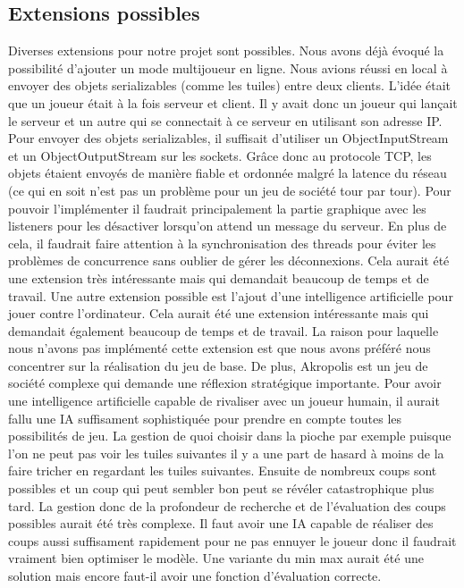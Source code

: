\documentclass{article}
\begin{document}
    
    \subsection{Extensions possibles}\label{subsec:extensions}

    Diverses extensions pour notre projet sont possibles. Nous avons déjà évoqué la possibilité d'ajouter un mode multijoueur en ligne. 
    Nous avions réussi en local à envoyer des objets serializables (comme les tuiles) entre deux clients. L'idée était que un joueur était à la fois serveur et client.
    Il y avait donc un joueur qui lançait le serveur et un autre qui se connectait à ce serveur en utilisant son adresse IP.
    Pour envoyer des objets serializables, il suffisait d'utiliser un ObjectInputStream et un ObjectOutputStream sur les sockets.
    Grâce donc au protocole TCP, les objets étaient envoyés de manière fiable et ordonnée malgré la latence du réseau (ce qui en soit n'est pas un problème pour un jeu de société tour par tour).
    Pour pouvoir l'implémenter il faudrait principalement la partie graphique avec les listeners pour les désactiver lorsqu'on attend un message du serveur.
    En plus de cela, il faudrait faire attention à la synchronisation des threads pour éviter les problèmes de concurrence sans oublier de gérer les déconnexions.
    Cela aurait été une extension très intéressante mais qui demandait beaucoup de temps et de travail.
    \newline
    Une autre extension possible est l'ajout d'une intelligence artificielle pour jouer contre l'ordinateur.
    Cela aurait été une extension intéressante mais qui demandait également beaucoup de temps et de travail.
    La raison pour laquelle nous n'avons pas implémenté cette extension est que nous avons préféré nous concentrer sur la réalisation du jeu de base.
    De plus, Akropolis est un jeu de société complexe qui demande une réflexion stratégique importante.
    Pour avoir une intelligence artificielle capable de rivaliser avec un joueur humain, il aurait fallu une IA suffisament sophistiquée pour prendre en compte toutes les possibilités de jeu.
    La gestion de quoi choisir dans la pioche par exemple puisque l'on ne peut pas voir les tuiles suivantes il y a une part de hasard à moins de la faire tricher en regardant les tuiles suivantes.
    Ensuite de nombreux coups sont possibles et un coup qui peut sembler bon peut se révéler catastrophique plus tard.
    La gestion donc de la profondeur de recherche et de l'évaluation des coups possibles aurait été très complexe.
    Il faut avoir une IA capable de réaliser des coups aussi suffisament rapidement pour ne pas ennuyer le joueur donc il faudrait vraiment bien optimiser le modèle.
    Une variante du min max aurait été une solution mais encore faut-il avoir une fonction d'évaluation correcte.
\end{document}
